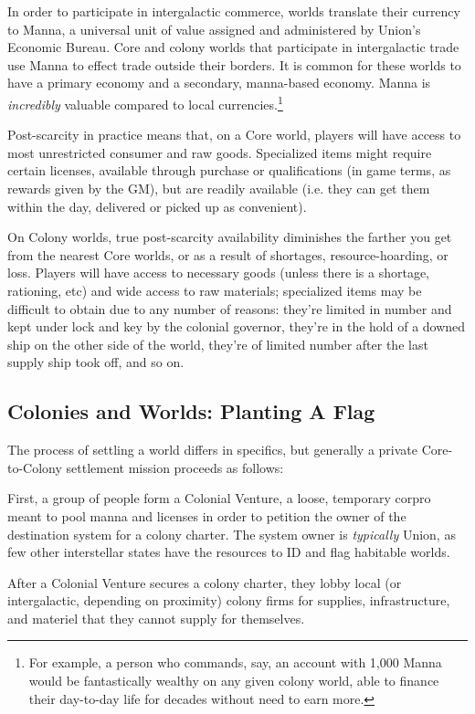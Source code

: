 In order to participate in intergalactic commerce, worlds translate their currency to Manna, a
universal unit of value assigned and administered by Union’s Economic Bureau. Core and colony
worlds that participate in intergalactic trade use Manna to effect trade outside their borders. It is
common for these worlds to have a primary economy and a secondary, manna-based economy.
Manna is \textit{incredibly} valuable compared to local currencies.\footnote{For example, a person who commands,
say, an account with 1,000 Manna would be fantastically wealthy on any given colony world, able to finance
their day-to-day life for decades without need to earn more.}

Post-scarcity in practice means that, on a Core world, players will have access to most
unrestricted consumer and raw goods. Specialized items might require certain licenses, available
through purchase or qualifications (in game terms, as rewards given by the GM), but are readily
available (i.e. they can get them within the day, delivered or picked up as convenient).

On Colony worlds, true post-scarcity availability diminishes the farther you get from the nearest
Core worlds, or as a result of shortages, resource-hoarding, or loss. Players will have access to
necessary goods (unless there is a shortage, rationing, etc) and wide access to raw materials;
specialized items may be difficult to obtain due to any number of reasons: they’re limited in
number and kept under lock and key by the colonial governor, they’re in the hold of a downed
ship on the other side of the world, they’re of limited number after the last supply ship took off,
and so on.

\subsection{Colonies and Worlds: Planting A Flag}

The process of settling a world differs in specifics, but generally a private Core-to-Colony
settlement mission proceeds as follows:

First, a group of people form a Colonial Venture, a loose, temporary corpro meant to pool manna
and licenses in order to petition the owner of the destination system for a colony charter. The
system owner is \textit{typically} Union, as few other interstellar states have the resources to ID and flag
habitable worlds.

After a Colonial Venture secures a colony charter, they lobby local (or intergalactic, depending on
proximity) colony firms for supplies, infrastructure, and materiel that they cannot supply for
themselves.

